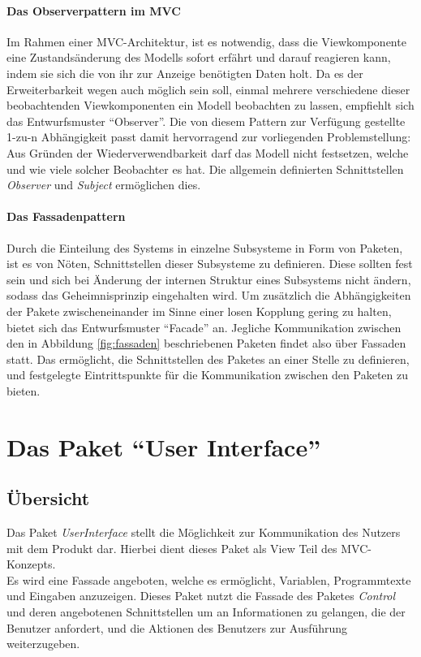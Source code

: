 \documentclass[parskip=full]{scrartcl}
\begin{document}
\paragraph{Das Observerpattern im MVC}
Im Rahmen einer MVC-Architektur, ist es notwendig, dass die Viewkomponente eine Zustandsänderung des Modells sofort erfährt und darauf reagieren kann, indem sie sich die von ihr zur Anzeige benötigten Daten holt. Da es der Erweiterbarkeit wegen auch möglich sein soll, einmal mehrere verschiedene dieser beobachtenden Viewkomponenten ein Modell beobachten zu lassen, empfiehlt sich das Entwurfsmuster \enquote{Observer}. Die von diesem Pattern zur Verfügung gestellte 1-zu-n Abhängigkeit passt damit hervorragend zur vorliegenden Problemstellung: Aus Gründen der Wiederverwendbarkeit darf das Modell nicht festsetzen, welche und wie viele solcher Beobachter es hat. Die allgemein definierten Schnittstellen \textit{Observer} und \textit{Subject} ermöglichen dies. 
\paragraph{Das Fassadenpattern}
Durch die Einteilung des Systems in einzelne Subsysteme in Form von Paketen, ist es von Nöten, Schnittstellen dieser Subsysteme zu definieren. Diese sollten fest sein und sich bei Änderung der internen Struktur eines Subsystems nicht ändern, sodass das Geheimnisprinzip eingehalten wird. Um zusätzlich die Abhängigkeiten der Pakete zwischeneinander im Sinne einer losen Kopplung gering zu halten, bietet sich das Entwurfsmuster \enquote{Facade} an. Jegliche Kommunikation zwischen den in Abbildung \ref{fig:fassaden} beschriebenen Paketen findet also über Fassaden statt. Das ermöglicht, die Schnittstellen des Paketes an einer Stelle zu definieren, und festgelegte Eintrittspunkte für die Kommunikation zwischen den Paketen zu bieten.


\newpage
\section{Das Paket \enquote{User Interface}}
\label{UI}
\subsection{Übersicht}
Das Paket \textit{UserInterface} stellt die Möglichkeit zur Kommunikation des Nutzers mit dem Produkt dar. Hierbei dient dieses Paket als View Teil des MVC-Konzepts. \\
Es wird eine Fassade angeboten, welche es ermöglicht, Variablen, Programmtexte und Eingaben anzuzeigen. Dieses Paket nutzt die Fassade des Paketes \textit{Control} und deren angebotenen Schnittstellen um an Informationen zu gelangen, die der Benutzer anfordert, und die Aktionen des Benutzers zur Ausführung weiterzugeben.
\end{document}
